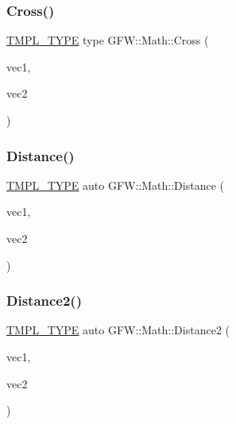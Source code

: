 \subsubsection{\texorpdfstring{Cross()}{Cross()}}
{\footnotesize\ttfamily \hyperlink{_math_8h_a2618808fbb8e74983f8aaea56d02752b}{T\+M\+P\+L\+\_\+\+T\+Y\+PE} type G\+F\+W\+::\+Math\+::\+Cross (\begin{DoxyParamCaption}\item[{const type \&}]{vec1,  }\item[{const type \&}]{vec2 }\end{DoxyParamCaption})}

\mbox{\label{namespace_g_f_w_1_1_math_ad1b76b5daaaabc2a45b27e2e55cda571}} 
\subsubsection{\texorpdfstring{Distance()}{Distance()}}
{\footnotesize\ttfamily \hyperlink{_math_8h_a2618808fbb8e74983f8aaea56d02752b}{T\+M\+P\+L\+\_\+\+T\+Y\+PE} auto G\+F\+W\+::\+Math\+::\+Distance (\begin{DoxyParamCaption}\item[{const type \&}]{vec1,  }\item[{const type \&}]{vec2 }\end{DoxyParamCaption})}

\mbox{\label{namespace_g_f_w_1_1_math_a3bc804252a887404d0879dd64b1974b1}} 
\subsubsection{\texorpdfstring{Distance2()}{Distance2()}}
{\footnotesize\ttfamily \hyperlink{_math_8h_a2618808fbb8e74983f8aaea56d02752b}{T\+M\+P\+L\+\_\+\+T\+Y\+PE} auto G\+F\+W\+::\+Math\+::\+Distance2 (\begin{DoxyParamCaption}\item[{const type \&}]{vec1,  }\item[{const type \&}]{vec2 }\end{DoxyParamCaption})}

\mbox{\label{namespace_g_f_w_1_1_math_a33158d68edc21df0fa9cd262091ab2b7}} 
